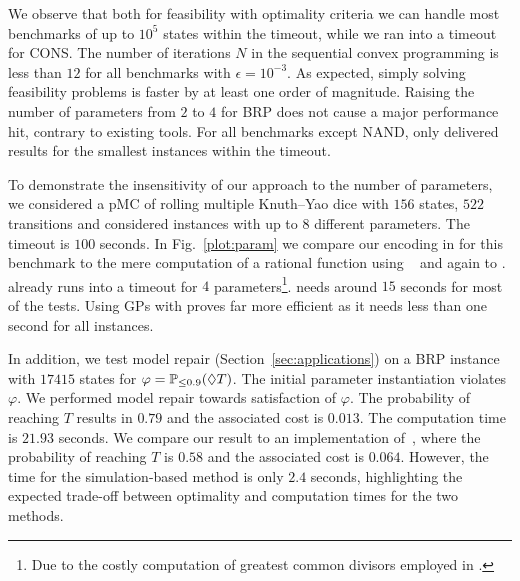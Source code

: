 We observe that both for feasibility with optimality criteria we can handle most benchmarks of up to $10^5$ states within the timeout, while we ran into a timeout for CONS. The number of iterations $N$ in the sequential convex programming is less than $12$ for all benchmarks with $\epsilon=10^{-3}$.
As expected, simply solving feasibility problems is faster by at least one order of magnitude. Raising the number of parameters from $2$ to $4$ for BRP does not cause a major performance hit, contrary to existing tools. For all benchmarks except NAND,  only delivered results for the smallest instances within the timeout. 

To demonstrate the insensitivity of our approach to the number of parameters, we considered a pMC of rolling multiple  Knuth--Yao dice with $156$ states, $522$ transitions and considered instances with up to $8$ different parameters. The timeout is $100$ seconds.
In Fig.~\ref{plot:param} we compare our encoding in  for this benchmark to the mere computation of a rational function using ~\cite{dehnert-et-al-cav-2015} and again to .  already runs into a timeout for $4$ parameters\footnote{Due to the costly computation of greatest common divisors employed in \prophesy.}.
 needs around $15$ seconds for most of the tests. Using GPs with  proves far more efficient  as it needs less than one second for all instances.

In addition, we test model repair (Section~\ref{sec:applications}) on a BRP instance with $17415$ states for $\varphi=\mathbb{P}_{\leq 0.9}(\lozenge T)$. The initial parameter instantiation violates $\varphi$. We performed model repair towards satisfaction of $\varphi$. The probability of reaching $T$ results in $0.79$ and the associated cost is $0.013$. The computation time is $21.93$ seconds. We compare our result to an implementation of~\cite{chen2013model}, where the probability of reaching $T$ is $0.58$ and the associated cost is $0.064$. However, the time for the simulation-based method is only $2.4$ seconds, highlighting the expected trade-off between optimality and computation times for the two methods.
	

